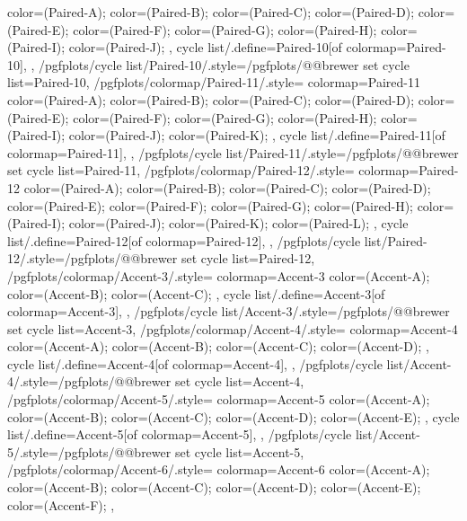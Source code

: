 {{{      color=(Paired-A);
      color=(Paired-B);
      color=(Paired-C);
      color=(Paired-D);
      color=(Paired-E);
      color=(Paired-F);
      color=(Paired-G);
      color=(Paired-H);
      color=(Paired-I);
      color=(Paired-J);
    },
    cycle list/.define={Paired-10}{[of colormap=Paired-10]},
  },
  /pgfplots/cycle list/Paired-10/.style={/pgfplots/@@brewer set cycle list={Paired-10}},
  /pgfplots/colormap/Paired-11/.style={
    colormap={Paired-11}{
      color=(Paired-A);
      color=(Paired-B);
      color=(Paired-C);
      color=(Paired-D);
      color=(Paired-E);
      color=(Paired-F);
      color=(Paired-G);
      color=(Paired-H);
      color=(Paired-I);
      color=(Paired-J);
      color=(Paired-K);
    },
    cycle list/.define={Paired-11}{[of colormap=Paired-11]},
  },
  /pgfplots/cycle list/Paired-11/.style={/pgfplots/@@brewer set cycle list={Paired-11}},
  /pgfplots/colormap/Paired-12/.style={
    colormap={Paired-12}{
      color=(Paired-A);
      color=(Paired-B);
      color=(Paired-C);
      color=(Paired-D);
      color=(Paired-E);
      color=(Paired-F);
      color=(Paired-G);
      color=(Paired-H);
      color=(Paired-I);
      color=(Paired-J);
      color=(Paired-K);
      color=(Paired-L);
    },
    cycle list/.define={Paired-12}{[of colormap=Paired-12]},
  },
  /pgfplots/cycle list/Paired-12/.style={/pgfplots/@@brewer set cycle list={Paired-12}},
  /pgfplots/colormap/Accent-3/.style={
    colormap={Accent-3}{
      color=(Accent-A);
      color=(Accent-B);
      color=(Accent-C);
    },
    cycle list/.define={Accent-3}{[of colormap=Accent-3]},
  },
  /pgfplots/cycle list/Accent-3/.style={/pgfplots/@@brewer set cycle list={Accent-3}},
  /pgfplots/colormap/Accent-4/.style={
    colormap={Accent-4}{
      color=(Accent-A);
      color=(Accent-B);
      color=(Accent-C);
      color=(Accent-D);
    },
    cycle list/.define={Accent-4}{[of colormap=Accent-4]},
  },
  /pgfplots/cycle list/Accent-4/.style={/pgfplots/@@brewer set cycle list={Accent-4}},
  /pgfplots/colormap/Accent-5/.style={
    colormap={Accent-5}{
      color=(Accent-A);
      color=(Accent-B);
      color=(Accent-C);
      color=(Accent-D);
      color=(Accent-E);
    },
    cycle list/.define={Accent-5}{[of colormap=Accent-5]},
  },
  /pgfplots/cycle list/Accent-5/.style={/pgfplots/@@brewer set cycle list={Accent-5}},
  /pgfplots/colormap/Accent-6/.style={
    colormap={Accent-6}{
      color=(Accent-A);
      color=(Accent-B);
      color=(Accent-C);
      color=(Accent-D);
      color=(Accent-E);
      color=(Accent-F);
    },
}}
